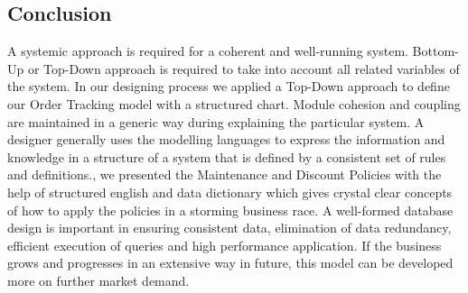 \begin{spacing}{1}
\section{Conclusion}
A systemic approach is required for a coherent and well-running system. Bottom-Up or Top-Down approach is required to take into account all related variables of the system. In our designing process we applied a Top-Down approach to define our Order Tracking model with a structured chart. Module cohesion and coupling are maintained in a generic way during explaining the particular system. A designer generally uses the modelling languages to express the information and knowledge in a structure of a system that is defined by a consistent set of rules and definitions., we presented the Maintenance and Discount Policies with the help of structured english and data dictionary which gives crystal clear concepts of how to apply the policies in a storming business race. A well-formed database design is important in ensuring consistent data, elimination of data redundancy, efficient execution of queries and high performance application. If the business grows and progresses in an extensive way in future, this model can be developed more on further market demand. 

\end{spacing}
\newpage
	